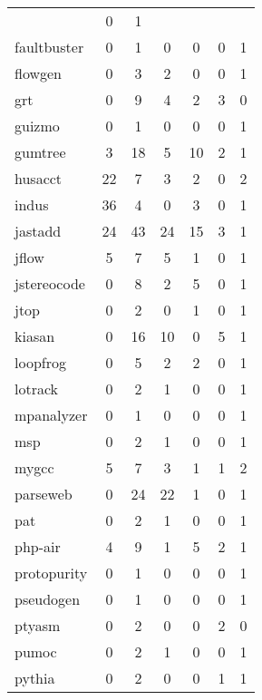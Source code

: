\begin{table}[H]
\begin{tabular}{| l | c | c | c | c | c | c |}
  &
  0
  &
  1
  \\
  faultbuster
  &
  0
  &
  1
  &
  0
  &
  0
  &
  0
  &
  1
  \\
  flowgen
  &
  0
  &
  3
  &
  2
  &
  0
  &
  0
  &
  1
  \\
  grt
  &
  0
  &
  9
  &
  4
  &
  2
  &
  3
  &
  0
  \\
  guizmo
  &
  0
  &
  1
  &
  0
  &
  0
  &
  0
  &
  1
  \\
  gumtree
  &
  3
  &
  18
  &
  5
  &
  10
  &
  2
  &
  1
  \\
  husacct
  &
  22
  &
  7
  &
  3
  &
  2
  &
  0
  &
  2
  \\
  indus
  &
  36
  &
  4
  &
  0
  &
  3
  &
  0
  &
  1
  \\
  jastadd
  &
  24
  &
  43
  &
  24
  &
  15
  &
  3
  &
  1
  \\
  jflow
  &
  5
  &
  7
  &
  5
  &
  1
  &
  0
  &
  1
  \\
  jstereocode
  &
  0
  &
  8
  &
  2
  &
  5
  &
  0
  &
  1
  \\
  jtop
  &
  0
  &
  2
  &
  0
  &
  1
  &
  0
  &
  1
  \\
  kiasan
  &
  0
  &
  16
  &
  10
  &
  0
  &
  5
  &
  1
  \\
  loopfrog
  &
  0
  &
  5
  &
  2
  &
  2
  &
  0
  &
  1
  \\
  lotrack
  &
  0
  &
  2
  &
  1
  &
  0
  &
  0
  &
  1
  \\
  mpanalyzer
  &
  0
  &
  1
  &
  0
  &
  0
  &
  0
  &
  1
  \\
  msp
  &
  0
  &
  2
  &
  1
  &
  0
  &
  0
  &
  1
  \\
  mygcc
  &
  5
  &
  7
  &
  3
  &
  1
  &
  1
  &
  2
  \\
  parseweb
  &
  0
  &
  24
  &
  22
  &
  1
  &
  0
  &
  1
  \\
  pat
  &
  0
  &
  2
  &
  1
  &
  0
  &
  0
  &
  1
  \\
  php-air
  &
  4
  &
  9
  &
  1
  &
  5
  &
  2
  &
  1
  \\
  protopurity
  &
  0
  &
  1
  &
  0
  &
  0
  &
  0
  &
  1
  \\
  pseudogen
  &
  0
  &
  1
  &
  0
  &
  0
  &
  0
  &
  1
  \\
  ptyasm
  &
  0
  &
  2
  &
  0
  &
  0
  &
  2
  &
  0
  \\
  pumoc
  &
  0
  &
  2
  &
  1
  &
  0
  &
  0
  &
  1
  \\
  pythia
  &
  0
  &
  2
  &
  0
  &
  0
  &
  1
  &
  1
  \\

\end{tabular}
\end{table}
